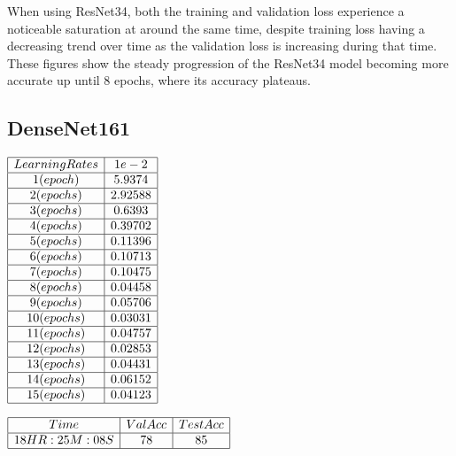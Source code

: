 \documentclass[conference]{IEEEtran}
\begin{document}
\FloatBarrier
When using ResNet34, both the training and validation loss experience a noticeable saturation at around the same time, despite training loss having a decreasing trend over time as the validation loss is increasing during that time.
These figures show the steady progression of the ResNet34 model becoming more accurate up until 8 epochs, where its accuracy plateaus. 
\subsection{DenseNet161} \label{DenseNet161}
\begin{center}
    $\begin{array}{| c | c |}
            \hline 
                Learning Rates & 1{e-2} \\ 
            \hline 
                1 (epoch)    & 5.9374 \\ 
            \hline 
                2 (epochs)  & 2.92588 \\
            \hline
                3 (epochs)  & 0.6393 \\
            \hline
                4 (epochs)  &  0.39702\\
            \hline
                5 (epochs)  & 0.11396 \\
            \hline
                6 (epochs) & 0.10713 \\
            \hline
                7 (epochs) & 0.10475 \\
            \hline
                8 (epochs) & 0.04458 \\
            \hline
                9 (epochs) & 0.05706 \\
            \hline
                10 (epochs) & 0.03031 \\
            \hline
                11 (epochs) & 0.04757 \\
            \hline
                12 (epochs) & 0.02853 \\
            \hline
                13 (epochs) & 0.04431 \\
            \hline
                14 (epochs) & 0.06152 \\
            \hline
                15 (epochs) & 0.04123 \\
            \hline
    \end{array}$
\end{center}
\begin{center}
    $\begin{array}{| c | c | c | c |}
            \hline 
                Time & Val Acc & Test Acc \\ 
            \hline 
                18HR:25M:08S & 78 & 85\\ 
            \hline
    \end{array}$
\end{center}
\end{document}
